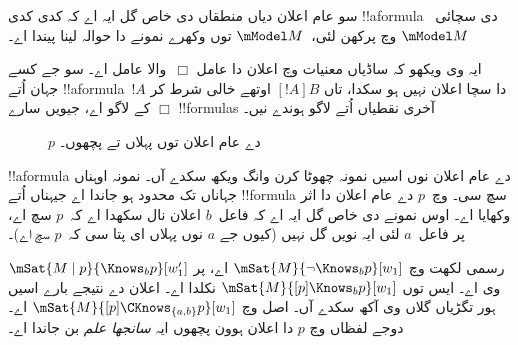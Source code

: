 \documentclass[../../../include/open-logic-section]{subfiles}
\begin{document}
سو عام اعلان دیاں منطقاں دی خاص گل ایہ اے کہ کدی کدی !!a{formula}
دی سچائی~$\mModel M$ وچ پرکھن لئی،~$\mModel M$ توں وکھرے نمونے دا
حوالہ لینا پیندا اے۔

ایہ وی ویکھو کہ ساڈیاں معنیات وچ اعلان دا عامل $\Box$~والا عامل
اے۔ سو جے کسے جہان اُتے !!a{formula}~$!A$ دا سچا اعلان نہیں ہو سکدا،
تاں $[!A]B$ اوتھے خالی شرط کر کے لاگو اے، جیویں سارے $\Box$
!!{formula}s آخری نقطیاں اُتے لاگو ہوندے نیں۔

\begin{figure}
  \begin{center}
  \end{center}
  \caption{$p$ دے عام اعلان توں پہلاں تے پچھوں۔}
\end{figure}

!!a{formula} دے عام اعلان نوں اسیں نمونہ چھوٹا کرن وانگ ویکھ سکدے
آں۔ نمونہ اوہناں جہاناں تک محدود ہو جاندا اے جیہناں اُتے !!{formula}
سچ سی۔  وچ~$p$ دے عام اعلان دا اثر
وکھایا اے۔ اوس نمونے دی خاص گل ایہ اے کہ فاعل~$b$ اعلان نال سکھدا
اے کہ~$p$ سچ اے، پر فاعل~$a$ لئی ایہ نویں گل نہیں (کیوں جے $a$
نوں پہلاں ای پتا سی کہ~$p$ سچ اے)۔

رسمی لکھت وچ $\mSat{M}{\lnot \Knows_b p}[w_1]$ اے، پر $\mSat{M
\mid p}{\Knows_b p}[w'_1]$ وی اے۔ ایس توں $\mSat{M}{[p] \Knows_b
p}[w_1]$ نکلدا اے۔ اعلان دے نتیجے بارے اسیں ہور تگڑیاں گلاں وی آکھ
سکدے آں۔ اصل وچ $\mSat{M}{[p]\CKnows_{\{a,b\}} p}[w_1]$ اے۔
دوجے لفظاں وچ $p$ دا اعلان ہوون پچھوں ایہ \emph{سانجھا علم} بن جاندا اے۔
\end{document}
